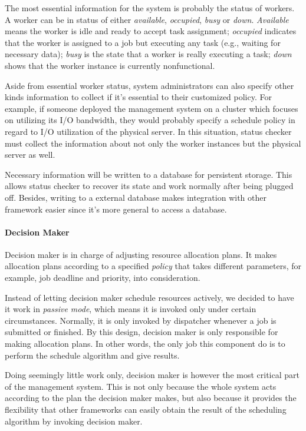 The most essential information for the system is probably the status of
workers.
A worker can be in status of either {\em available}, {\em occupied},
{\em busy} or {\em down}.
{\em Available} means the worker is idle and ready to accept task
assignment; {\em occupied} indicates that the worker is assigned to a
job but executing any task (e.g., waiting for necessary data); {\em
busy} is the state that a worker is really executing a task; {\em down}
shows that the worker instance is currently nonfunctional. 

Aside from essential worker status, system administrators can also
specify other kinds information to collect if it's essential to  their
customized policy.
For example, if someone deployed the management system on a cluster
which focuses on utilizing its I/O bandwidth, they would probably
specify a schedule policy in regard to I/O utilization of the physical
server.
In this situation, status checker must collect the information about not
only the worker instances but the physical server as well.

Necessary information will be written to a database for persistent
storage.
This allows status checker to recover its state and work normally after
being plugged off.
Besides, writing to a external database makes integration with other
framework easier since it's more general to access a database.

\paragraph{Decision Maker}	%

Decision maker is in charge of adjusting resource allocation plans.
It makes allocation plans according to a specified {\em policy} that
takes different parameters, for example, job deadline and priority, into
consideration. 

Instead of letting decision maker schedule resources actively, we
decided to have it work in {\em passive mode}, which means it is invoked
only under certain circumstances.
Normally, it is only invoked by dispatcher whenever a job is submitted
or finished.
By this design, decision maker is only responsible for making allocation
plans.
In other words, the only job this component do is to perform the
schedule algorithm and give results.

Doing seemingly little work only, decision maker is however the most
critical part of the management system.
This is not only because the whole system acts according to the plan the
decision maker makes, but also because it provides the flexibility that
other frameworks can easily obtain the result of the scheduling
algorithm by invoking decision maker.

